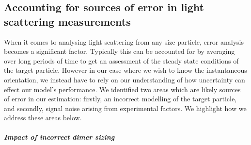 \subsection{Accounting for sources of error in light scattering measurements}
When it comes to analysing light scattering from any size particle, error analysis becomes a significant factor. Typically this can be accounted for by averaging over long periods of time to get an assessment of the steady state conditions of the target particle. However in our case where we wish to know the instantaneous orientation, we instead have to rely on our understanding of how uncertainty can effect our model's performance. We identified two areas which are likely sources of error in our estimation: firstly, an incorrect modelling of the target particle, and secondly, signal noise arising from experimental factors. We highlight how we address these areas below. 
\subparagraph{Impact of incorrect dimer sizing}
\label{sec:lam}

